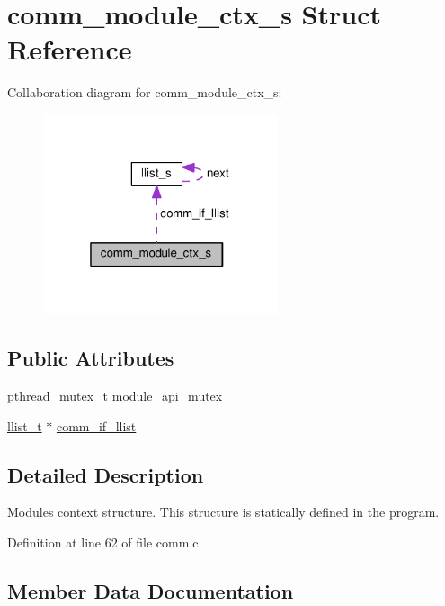 \hypertarget{structcomm__module__ctx__s}{}\section{comm\+\_\+module\+\_\+ctx\+\_\+s Struct Reference}
\label{structcomm__module__ctx__s}


Collaboration diagram for comm\+\_\+module\+\_\+ctx\+\_\+s\+:\nopagebreak
\begin{figure}[H]
\begin{center}
\leavevmode
\includegraphics[width=196pt]{structcomm__module__ctx__s__coll__graph}
\end{center}
\end{figure}
\subsection*{Public Attributes}
\begin{DoxyCompactItemize}
\item 
pthread\+\_\+mutex\+\_\+t \hyperlink{structcomm__module__ctx__s_a065cf60f09cc13971556a494dc35425f}{module\+\_\+api\+\_\+mutex}
\item 
\hyperlink{llist_8h_a90862badf6f9cc4e3d6348b7d60ce4f0}{llist\+\_\+t} $\ast$ \hyperlink{structcomm__module__ctx__s_aca7d8c9e08de7feabe5818c35abd2244}{comm\+\_\+if\+\_\+llist}
\end{DoxyCompactItemize}


\subsection{Detailed Description}
Module\textquotesingle{}s context structure. This structure is statically defined in the program. 

Definition at line 62 of file comm.\+c.



\subsection{Member Data Documentation}
